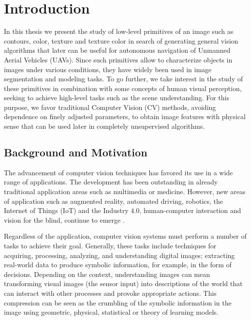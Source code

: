 \chapter*{Introduction}
In this thesis we present the study of low-level primitives of an image such as contours, color, texture and texture color in search of generating general vision algorithms that later can be useful for autonomous navigation of Unmanned Aerial Vehicles (UAVs). Since such primitives allow to characterize objects in images under various conditions, they have widely been used in image segmentation and modeling tasks. To go further, we take interest in the study of these primitives in combination with some concepts of human visual perception, seeking to achieve high-level tasks such as the scene understanding. For this purpose, we favor traditional Computer Vision (CV) methods, avoiding dependence on finely adjusted parameters, to obtain image features with physical sense that can be used later in completely unsupervised algorithms.

\section*{Background and Motivation}

The advancement of computer vision techniques has favored its use in a wide range of applications. The development has been outstanding in already traditional application areas such as multimedia or medicine. However, new areas of application such as augmented reality, automated driving, robotics, the Internet of Things (IoT) and the Industry 4.0, human-computer interaction and vision for the blind, continue to emerge . 

Regardless of the application, computer vision systems must perform a number of tasks to achieve their goal. Generally, these tasks include techniques for acquiring, processing, analyzing, and understanding digital images; extracting real-world data to produce symbolic information, for example, in the form of decisions. Depending on the context, understanding images can mean transforming visual images (the sensor input) into descriptions of the world that can interact with other processes and provoke appropriate actions. This compression can be seen as the crumbling of the symbolic information in the image using geometric, physical, statistical or theory of learning models.

